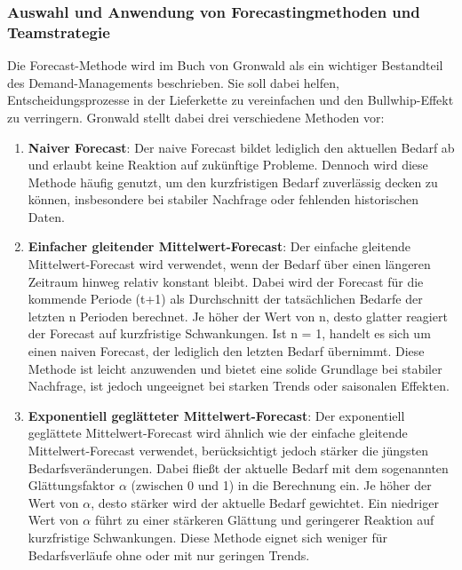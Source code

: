 \documentclass[a4paper,12pt]{article}
\begin{document}
\subsubsection{Auswahl und Anwendung von Forecastingmethoden und Teamstrategie}
Die Forecast-Methode wird im Buch von Gronwald als ein wichtiger Bestandteil des Demand-Managements beschrieben.
Sie soll dabei helfen, Entscheidungsprozesse in der Lieferkette zu vereinfachen und den Bullwhip-Effekt zu verringern.
Gronwald stellt dabei drei verschiedene Methoden vor:
\begin{enumerate}
    \item \textbf{Naiver Forecast}:\newline
    Der naive Forecast bildet lediglich den aktuellen Bedarf ab und erlaubt keine Reaktion auf zukünftige Probleme.
    Dennoch wird diese Methode häufig genutzt, um den kurzfristigen Bedarf zuverlässig decken zu können,
    insbesondere bei stabiler Nachfrage oder fehlenden historischen Daten.
    \item \textbf{Einfacher gleitender Mittelwert-Forecast}:\newline
    Der einfache gleitende Mittelwert-Forecast wird verwendet, wenn der Bedarf über einen längeren Zeitraum hinweg relativ konstant bleibt.
    Dabei wird der Forecast für die kommende Periode (t+1) als Durchschnitt der tatsächlichen Bedarfe der letzten n Perioden berechnet.
    Je höher der Wert von n, desto glatter reagiert der Forecast auf kurzfristige Schwankungen.
    Ist n = 1, handelt es sich um einen naiven Forecast, der lediglich den letzten Bedarf übernimmt.
    Diese Methode ist leicht anzuwenden und bietet eine solide Grundlage bei stabiler Nachfrage,
    ist jedoch ungeeignet bei starken Trends oder saisonalen Effekten.
    \item \textbf{Exponentiell geglätteter Mittelwert-Forecast}:\newline
    Der exponentiell geglättete Mittelwert-Forecast wird ähnlich wie der einfache gleitende Mittelwert-Forecast verwendet,
    berücksichtigt jedoch stärker die jüngsten Bedarfsveränderungen.
    Dabei fließt der aktuelle Bedarf mit dem sogenannten Glättungsfaktor $\alpha$ (zwischen 0 und 1) in die Berechnung ein.
    Je höher der Wert von $\alpha$, desto stärker wird der aktuelle Bedarf gewichtet.
    Ein niedriger Wert von $\alpha$ führt zu einer stärkeren Glättung und geringerer Reaktion auf kurzfristige Schwankungen.
    Diese Methode eignet sich weniger für Bedarfsverläufe ohne oder mit nur geringen Trends.
\end{enumerate}
\cite[Kapitel 3.5]{Gronwald2020}
\end{document}
